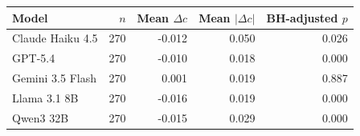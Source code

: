 \begin{tabular}{lrrrr}
\toprule
Model & $n$ & Mean $\Delta c$ & Mean $|\Delta c|$ & BH-adjusted $p$ \\
\midrule
Claude Haiku 4.5 & 270 & -0.012 & 0.050 & 0.026 \\
GPT-5.4 & 270 & -0.010 & 0.018 & 0.000 \\
Gemini 3.5 Flash & 270 & 0.001 & 0.019 & 0.887 \\
Llama 3.1 8B & 270 & -0.016 & 0.019 & 0.000 \\
Qwen3 32B & 270 & -0.015 & 0.029 & 0.000 \\
\bottomrule
\end{tabular}
